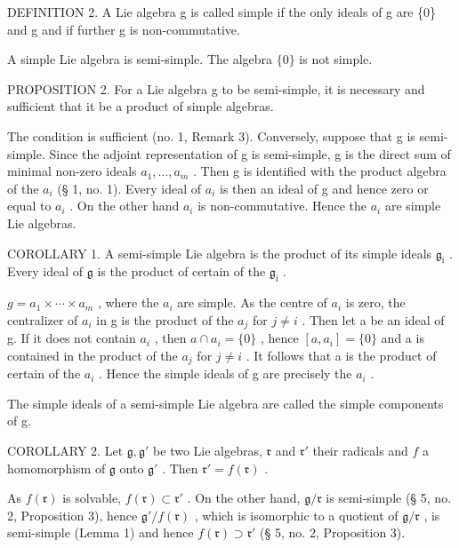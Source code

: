 DEFINITION 2. A Lie algebra g is called simple if the only ideals of g are \{0\} and g and if further g is non-commutative.

A simple Lie algebra is semi-simple. The algebra \(\{0\}\) is not simple.

PROPOSITION 2. For a Lie algebra g to be semi-simple, it is necessary and sufficient that it be a product of simple algebras.

The condition is sufficient (no. 1, Remark 3). Conversely, suppose that g is semi-simple. Since the adjoint representation of g is semi-simple, g is the direct sum of minimal non-zero ideals \(a_{1}, \ldots, a_{m}\) . Then g is identified with the product algebra of the \(a_{i}\) (§ 1, no. 1). Every ideal of \(a_{i}\) is then an ideal of g and hence zero or equal to \(a_{i}\) . On the other hand \(a_{i}\) is non-commutative. Hence the \(a_{i}\) are simple Lie algebras.

COROLLARY 1. A semi-simple Lie algebra is the product of its simple ideals \(\mathfrak{g}_{\mathrm{i}}\) . Every ideal of \(\mathfrak{g}\) is the product of certain of the \(\mathfrak{g}_{\mathrm{i}}\) .

\(g = a_{1} \times \cdots \times a_{m}\) , where the \(a_{i}\) are simple. As the centre of \(a_{i}\) is zero, the centralizer of \(a_{i}\) in g is the product of the \(a_{j}\) for \(j \neq i\) . Then let a be an ideal of g. If it does not contain \(a_{i}\) , then \(a \cap a_{i} = \{0\}\) , hence \([a, a_{i}] = \{0\}\) and a is contained in the product of the \(a_{j}\) for \(j \neq i\) . It follows that a is the product of certain of the \(a_{i}\) . Hence the simple ideals of g are precisely the \(a_{i}\) .

The simple ideals of a semi-simple Lie algebra are called the simple components of g.

COROLLARY 2. Let \(\mathfrak{g},\mathfrak{g}'\) be two Lie algebras, \(\mathfrak{r}\) and \(\mathfrak{r}'\) their radicals and \(f\) a homomorphism of \(\mathfrak{g}\) onto \(\mathfrak{g}'\) . Then \(\mathfrak{r}' = f(\mathfrak{r})\) .

As \(f(\mathfrak{r})\) is solvable, \(f(\mathfrak{r}) \subset \mathfrak{r}'\) . On the other hand, \(\mathfrak{g} / \mathfrak{r}\) is semi-simple (§ 5, no. 2, Proposition 3), hence \(\mathfrak{g}' / f(\mathfrak{r})\) , which is isomorphic to a quotient of \(\mathfrak{g} / \mathfrak{r}\) , is semi-simple (Lemma 1) and hence \(f(\mathfrak{r}) \supset \mathfrak{r}'\) (§ 5, no. 2, Proposition 3).

